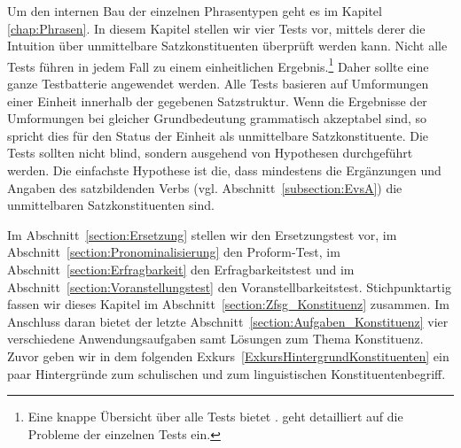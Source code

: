 Um den internen Bau der einzelnen Phrasentypen geht es im Kapitel \ref{chap:Phrasen}. In diesem Kapitel stellen wir vier Tests vor, mittels derer die Intuition über unmittelbare Satzkonstituenten überprüft werden kann. Nicht alle Tests führen in jedem Fall zu einem einheitlichen Ergebnis.\footnote{Eine knappe Übersicht über alle Tests bietet \citet{MachicaoyPriemer2018}. \citet[7--11]{Mueller2010} geht detailliert auf die Probleme der einzelnen Tests ein.} Daher sollte eine ganze Testbatterie angewendet werden. Alle Tests basieren auf Umformungen einer Einheit innerhalb der gegebenen Satzstruktur. Wenn die Ergebnisse der Umformungen bei gleicher Grundbedeutung grammatisch akzeptabel sind, so spricht dies für den Status der Einheit als unmittelbare Satzkonstituente. Die Tests sollten nicht blind, sondern ausgehend von Hypothesen durchgeführt werden. Die einfachste Hypothese ist die, dass mindestens die Ergänzungen und Angaben des satzbildenden Verbs (vgl. Abschnitt~\ref{subsection:EvsA}) die unmittelbaren Satzkonstituenten sind. 

Im Abschnitt~\ref{section:Ersetzung} stellen wir den Ersetzungstest vor, im Abschnitt~\ref{section:Pronominalisierung} den Proform-Test, im Abschnitt~\ref{section:Erfragbarkeit} den Erfragbarkeitstest und im Abschnitt~\ref{section:Voranstellungstest} den Voranstellbarkeitstest. Stichpunktartig fassen wir dieses Kapitel im Abschnitt~\ref{section:Zfsg_Konstituenz} zusammen. Im Anschluss daran bietet der letzte Abschnitt~\ref{section:Aufgaben_Konstituenz} vier verschiedene Anwendungsaufgaben samt Lösungen zum Thema Konstituenz. Zuvor geben wir in dem folgenden Exkurs~\ref{ExkursHintergrundKonstituenten} ein paar Hintergründe zum schulischen und zum linguistischen Konstituentenbegriff.   


